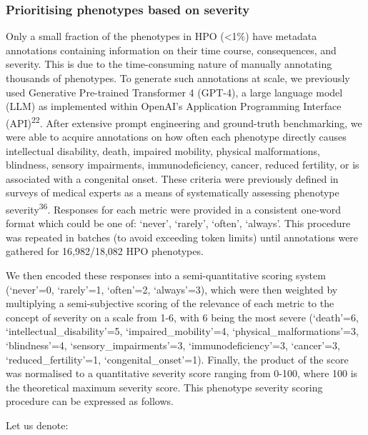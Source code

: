 \documentclass[
]{article}
\begin{document}
\subsubsection{Prioritising phenotypes based on
severity}\label{prioritising-phenotypes-based-on-severity}

Only a small fraction of the phenotypes in HPO (\textless1\%) have
metadata annotations containing information on their time course,
consequences, and severity. This is due to the time-consuming nature of
manually annotating thousands of phenotypes. To generate such
annotations at scale, we previously used Generative Pre-trained
Transformer 4 (GPT-4), a large language model (LLM) as implemented
within OpenAI's Application Programming Interface
(API)\textsuperscript{22}. After extensive prompt engineering and
ground-truth benchmarking, we were able to acquire annotations on how
often each phenotype directly causes intellectual disability, death,
impaired mobility, physical malformations, blindness, sensory
impairments, immunodeficiency, cancer, reduced fertility, or is
associated with a congenital onset. These criteria were previously
defined in surveys of medical experts as a means of systematically
assessing phenotype severity\textsuperscript{36}. Responses for each
metric were provided in a consistent one-word format which could be one
of: `never', `rarely', `often', `always'. This procedure was repeated in
batches (to avoid exceeding token limits) until annotations were
gathered for 16,982/18,082 HPO phenotypes.

We then encoded these responses into a semi-quantitative scoring system
(`never'=0, `rarely'=1, `often'=2, `always'=3), which were then weighted
by multiplying a semi-subjective scoring of the relevance of each metric
to the concept of severity on a scale from 1-6, with 6 being the most
severe (`death'=6, `intellectual\_disability'=5, `impaired\_mobility'=4,
`physical\_malformations'=3, `blindness'=4, `sensory\_impairments'=3,
`immunodeficiency'=3, `cancer'=3, `reduced\_fertility'=1,
`congenital\_onset'=1). Finally, the product of the score was normalised
to a quantitative severity score ranging from 0-100, where 100 is the
theoretical maximum severity score. This phenotype severity scoring
procedure can be expressed as follows.

Let us denote:
\end{document}
